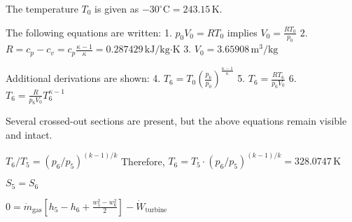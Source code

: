 The temperature \( T_0 \) is given as \( -30^\circ \text{C} = 243.15 \, \text{K} \).  

The following equations are written:  
1. \( p_0 V_0 = R T_0 \) implies \( V_0 = \frac{R T_0}{p_0} \)  
2. \( R = c_p - c_v = c_p \frac{\kappa - 1}{\kappa} = 0.287429 \, \text{kJ}/\text{kg·K} \)  
3. \( V_0 = 3.65908 \, \text{m}^3/\text{kg} \)  

Additional derivations are shown:  
4. \( T_6 = T_0 \left( \frac{p_6}{p_0} \right)^{\frac{\kappa - 1}{\kappa}} \)  
5. \( T_6 = \frac{R T_6}{p_6 V_0} \)  
6. \( T_6 = \frac{R}{p_6 V_0} T_6^{\kappa - 1} \)  

Several crossed-out sections are present, but the above equations remain visible and intact.

\( T_6 / T_5 = (p_6 / p_5)^{(k-1)/k} \)  
Therefore, \( T_6 = T_5 \cdot (p_6 / p_5)^{(k-1)/k} = 328.0747 \, \text{K} \)  

\( S_5 = S_6 \)  

\( 0 = \dot{m}_{\text{gas}} \left[ h_5 - h_6 + \frac{w_5^2 - w_6^2}{2} \right] - \dot{W}_{\text{turbine}} \)